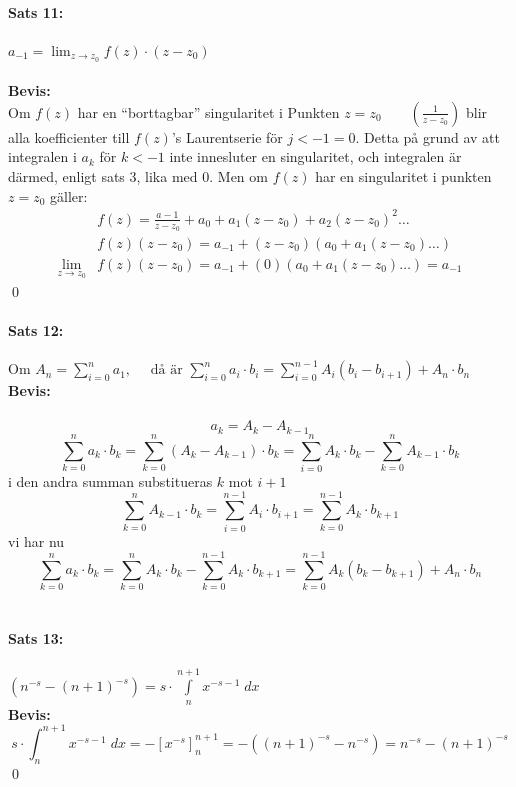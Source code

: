 \documentclass{article}%
\begin{document}
\paragraph{Sats 11:} $a_{-1} = \lim_{z \to z_0} f(z) \cdot (z - z_0)$\\
\\
{\bf Bevis:}\\
Om $f(z)$ har en ``borttagbar'' singularitet i Punkten $z = z_0 \qquad \left ( \frac {1} {z - z_0} \right )$ blir 
alla koefficienter till $f(z)$'s Laurentserie för $j < -1 = 0$. Detta på grund av att integralen i $a_k$ för $k < -1$
inte innesluter en singularitet, och integralen  är därmed, enligt sats 3, lika med $0$.
Men om $f(z)$ har en singularitet i punkten $z = z_0$ gäller:
\begin{align*}
	&f(z) = \frac {a - 1} {z - z_0} + a_0 + a_1(z - z_0) + a_2(z - z_0)^2 \ldots \\
	&f(z) (z - z_0) = a_{-1} + (z - z_0)(a_0 + a_1 (z - z_0) \ldots ) \\
	\lim_{z \to z_0} &f(z)(z - z_0) = a_{- 1} + (0)(a_0 + a_1(z - z_0) \ldots ) = a_{-1}
\end{align*}
\hfill \qed
\\
\paragraph{Sats 12:} %
Om $A_n = \sum\limits_{i = 0}^n a_1, \quad \text{ då är } \sum\limits_{i = 0}^n a_i \cdot b_i = 
		\sum\limits_{i = 0}^{n - 1} A_i (b_i - b_{i + 1}) + A_n \cdot b_n$\\
{\bf Bevis:}\\
\\
\[ a_k = A_k - A_{k - 1} \]
\[
	\sum_{k = 0}^n a_k \cdot b_k =  \sum_{k = 0}^n (A_k - A_{k - 1}) \cdot b_k = \sum_{i = 0}^n A_k \cdot b_k - 
		\sum_{k = 0}^n A_{k - 1} \cdot b_k
\]
i den andra summan substitueras $k$ mot $i + 1$
\[
	\sum_{k = 0}^n A_{k - 1} \cdot b_k = \sum_{i = 0}^{n - 1} A_i \cdot b_{i + 1} = \sum_{k = 0}^{n - 1} A_k \cdot b_{k + 1}
\]
vi har nu
\[
	\sum_{k = 0}^n a_k \cdot b_k = \sum_{k = 0}^n A_k \cdot b_k - \sum_{k = 0}^{n - 1} A_k \cdot b_{k + 1} =
		\sum_{k = 0}^{n - 1} A_k (b_k - b_{k + 1}) + A_n \cdot b_n
\]
\\
\paragraph{Sats 13:} $(n^{-s} - (n + 1)^{-s}) = s \cdot \int\limits_n^{n + 1} x^{-s - 1} \; dx$\\
{\bf Bevis:}\\
\[
	s \cdot \int_n^{n + 1} x^{-s - 1} \; dx = - [ x^{-s} ]_n^{n + 1} = - ((n + 1)^{-s} - n^{-s})
		= n^{-s} -(n + 1)^{-s}
\]
\hfill \qed
\\
\end{document}
